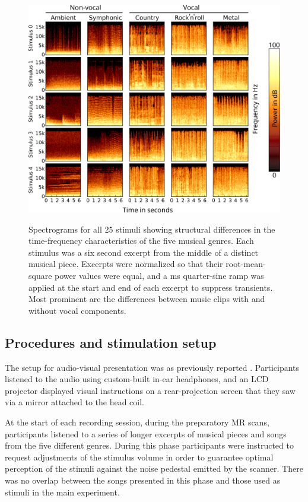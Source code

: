 \documentclass[10pt,a4paper,twocolumn]{article}
\begin{document}
\begin{figure}
  \centering
  \includegraphics[width=11.5cm]{stimulus_specgrams}\\

  \caption{
    Spectrograms for all 25 stimuli showing structural differences in the
    time-frequency characteristics of the five musical genres.  Each stimulus
    was a six second excerpt from the middle of a distinct musical piece.
    Excerpts were normalized so that their root-mean-square power values were
    equal, and a \unit[50]{ms} quarter-sine ramp was applied at the start and
    end of each excerpt to suppress transients.  Most prominent are the
    differences between music clips with and without vocal components.
  }

  \label{fig:spectrograms}
\end{figure}


\subsection*{Procedures and stimulation setup}

The setup for audio-visual presentation was as previously reported
\cite{HBI+14}. Participants listened to the audio using custom-built in-ear
headphones, and an LCD projector displayed visual instructions on a
rear-projection screen that they saw via a mirror attached to the head coil.

At the start of each recording session, during the preparatory MR scans,
participants listened to a series of longer excerpts of musical pieces and
songs from the five different genres. During this phase participants were
instructed to request adjustments of the stimulus volume in order to guarantee
optimal perception of the stimuli against the noise pedestal emitted by the
scanner. There was no overlap between the songs presented in this phase and those
used as stimuli in the main experiment.
\end{document}
